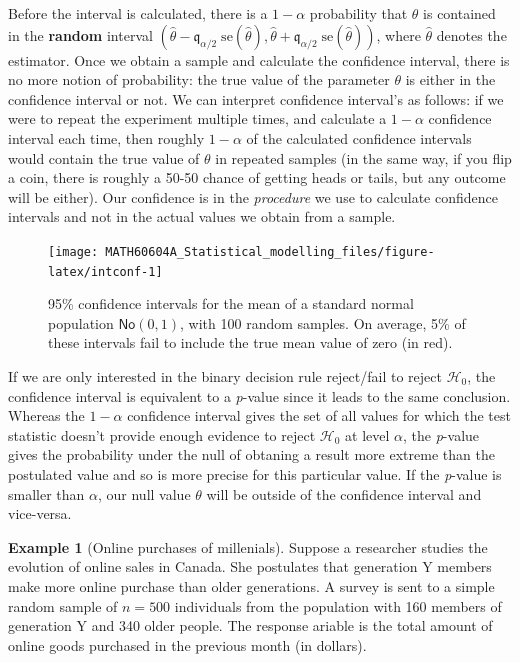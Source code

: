 \documentclass[
  11pt,
  letterpaper,
]{book}
\theoremstyle{definition}
\theoremstyle{definition}
\newtheorem{example}{Example}[chapter]
\theoremstyle{definition}
\theoremstyle{remark}
\begin{document}
Before the interval is calculated, there is a \(1-\alpha\) probability that \(\theta\) is contained in the \textbf{random} interval \((\widehat{\theta} - \mathfrak{q}_{\alpha/2} \; \mathrm{se}(\widehat{\theta}), \widehat{\theta} + \mathfrak{q}_{\alpha/2} \; \mathrm{se}(\widehat{\theta}))\), where \(\widehat{\theta}\) denotes the estimator. Once we obtain a sample and calculate the confidence interval, there is no more notion of probability: the true value of the parameter \(\theta\) is either in the confidence interval or not. We can interpret confidence interval's as follows: if we were to repeat the experiment multiple times, and calculate a \(1-\alpha\) confidence interval each time, then roughly \(1-\alpha\) of the calculated confidence intervals would contain the true value of \(\theta\) in repeated samples (in the same way, if you flip a coin, there is roughly a 50-50 chance of getting heads or tails, but any outcome will be either). Our confidence is in the \emph{procedure} we use to calculate confidence intervals and not in the actual values we obtain from a sample.

\begin{figure}

{\centering \texttt{[image: MATH60604A\_Statistical\_modelling\_files/figure-latex/intconf-1]} 

}

\caption{95\% confidence intervals for the mean of a standard normal population $\mathsf{No}(0,1)$, with 100 random samples. On average, 5\% of these intervals fail to include the true mean value of zero (in red).}\label{fig:intconf}
\end{figure}

If we are only interested in the binary decision rule reject/fail to reject \(\mathscr{H}_0\), the confidence interval is equivalent to a \emph{p}-value since it leads to the same conclusion. Whereas the \(1-\alpha\) confidence interval gives the set of all values for which the test statistic doesn't provide enough evidence to reject \(\mathscr{H}_0\) at level \(\alpha\), the \emph{p}-value gives the probability under the null of obtaning a result more extreme than the postulated value and so is more precise for this particular value. If the \emph{p}-value is smaller than \(\alpha\), our null value \(\theta\) will be outside of the confidence interval and vice-versa.

\begin{example}[Online purchases of millenials]
\protect\hypertarget{exm:achats-milleniaux}{}{\label{exm:achats-milleniaux} {} }
Suppose a researcher studies the evolution of online sales in Canada. She postulates that generation Y members make more online purchase than older generations. A survey is sent to a simple random sample of \(n=500\) individuals from the population with 160 members of generation Y and 340 older people. The response ariable is the total amount of online goods purchased in the previous month (in dollars).
\end{example}
\end{document}
